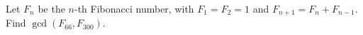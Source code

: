 Let $F_n$ be the $n$-th Fibonacci number, with $F_1=F_2=1$ and $F_{n+1}=F_n+F_{n-1}$. Find $\gcd(F_{66},F_{300})$.
